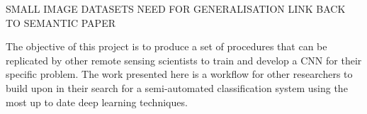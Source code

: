 SMALL IMAGE DATASETS
NEED FOR GENERALISATION
LINK BACK TO SEMANTIC PAPER
\par
The objective of this project is to produce a set of procedures that can be replicated by other remote sensing scientists to train and develop a CNN for their specific problem. The work presented here is a workflow for other researchers to build upon in their search for a semi-automated classification system using the most up to date deep learning techniques.





